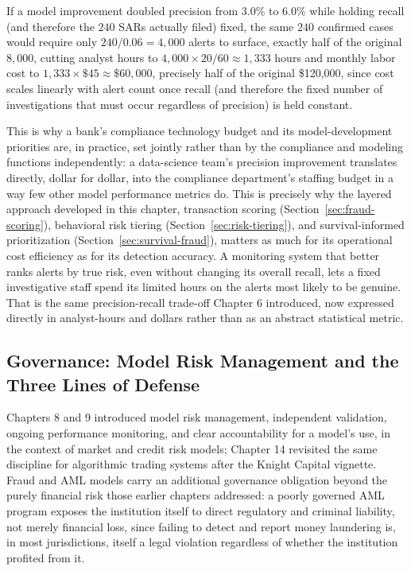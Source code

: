 \documentclass[../ai_in_finance]{subfiles}
\begin{document}
If a model improvement doubled precision from $3.0\%$ to $6.0\%$ while holding recall (and therefore the $240$ SARs actually filed) fixed, the same $240$ confirmed cases would require only $240/0.06 = 4{,}000$ alerts to surface, exactly half of the original $8{,}000$, cutting analyst hours to $4{,}000 \times 20/60 \approx 1{,}333$ hours and monthly labor cost to $1{,}333 \times \$45 \approx \$60{,}000$, precisely half of the original \$120,000, since cost scales linearly with alert count once recall (and therefore the fixed number of investigations that must occur regardless of precision) is held constant.

This is why a bank's compliance technology budget and its model-development priorities are, in practice, set jointly rather than by the compliance and modeling functions independently: a data-science team's precision improvement translates directly, dollar for dollar, into the compliance department's staffing budget in a way few other model performance metrics do. This is precisely why the layered approach developed in this chapter, transaction scoring (Section~\ref{sec:fraud-scoring}), behavioral risk tiering (Section~\ref{sec:risk-tiering}), and survival-informed prioritization (Section~\ref{sec:survival-fraud}), matters as much for its operational cost efficiency as for its detection accuracy. A monitoring system that better ranks alerts by true risk, even without changing its overall recall, lets a fixed investigative staff spend its limited hours on the alerts most likely to be genuine. That is the same precision-recall trade-off Chapter 6 introduced, now expressed directly in analyst-hours and dollars rather than as an abstract statistical metric.

\subsection{Governance: Model Risk Management and the Three Lines of Defense}
\label{sec:governance-3lod}

Chapters 8 and 9 introduced model risk management, independent validation, ongoing performance monitoring, and clear accountability for a model's use, in the context of market and credit risk models; Chapter 14 revisited the same discipline for algorithmic trading systems after the Knight Capital vignette. Fraud and AML models carry an additional governance obligation beyond the purely financial risk those earlier chapters addressed: a poorly governed AML program exposes the institution itself to direct regulatory and criminal liability, not merely financial loss, since failing to detect and report money laundering is, in most jurisdictions, itself a legal violation regardless of whether the institution profited from it.
\end{document}
